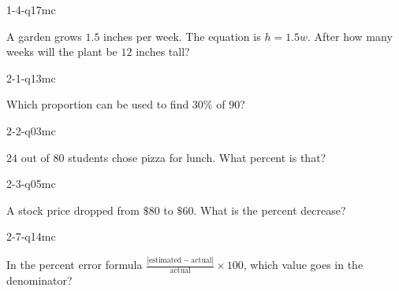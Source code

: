 
\begin{practiceQuestion}{1-4-q17}{mc}
\begin{questionText}
A garden grows $1.5$ inches per week. The equation is $h = 1.5w$. After how many weeks will the plant be $12$ inches tall?
\end{questionText}
\end{practiceQuestion}

\begin{practiceQuestion}{2-1-q13}{mc}
\begin{questionText}
Which proportion can be used to find $30\%$ of $90$?
\end{questionText}
\end{practiceQuestion}

\begin{practiceQuestion}{2-2-q03}{mc}
\begin{questionText}
$24$ out of $80$ students chose pizza for lunch. What percent is that?
\end{questionText}
\end{practiceQuestion}

\begin{practiceQuestion}{2-3-q05}{mc}
\begin{questionText}
A stock price dropped from $\$80$ to $\$60$. What is the percent decrease?


\end{questionText}
\end{practiceQuestion}

\begin{practiceQuestion}{2-7-q14}{mc}
\begin{questionText}
In the percent error formula $\frac{|\text{estimated} - \text{actual}|}{\text{actual}} \times 100$, which value goes in the denominator?
\end{questionText}
\end{practiceQuestion}

